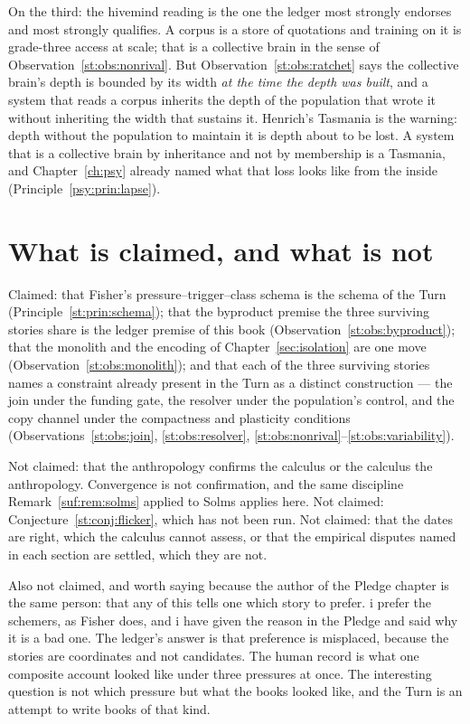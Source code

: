 On the third: the hivemind reading is the one the ledger most strongly endorses and most strongly qualifies. A corpus is a store of quotations and training on it is grade-three access at scale; that is a collective brain in the sense of Observation~\ref{st:obs:nonrival}. But Observation~\ref{st:obs:ratchet} says the collective brain's depth is bounded by its width \emph{at the time the depth was built}, and a system that reads a corpus inherits the depth of the population that wrote it without inheriting the width that sustains it. Henrich's Tasmania is the warning: depth without the population to maintain it is depth about to be lost. A system that is a collective brain by inheritance and not by membership is a Tasmania, and Chapter~\ref{ch:psy} already named what that loss looks like from the inside (Principle~\ref{psy:prin:lapse}).

\section{What is claimed, and what is not}
\label{st:sec:claims}

Claimed: that Fisher's pressure--trigger--class schema is the schema of the Turn (Principle~\ref{st:prin:schema}); that the byproduct premise the three surviving stories share is the ledger premise of this book (Observation~\ref{st:obs:byproduct}); that the monolith and the encoding of Chapter~\ref{sec:isolation} are one move (Observation~\ref{st:obs:monolith}); and that each of the three surviving stories names a constraint already present in the Turn as a distinct construction --- the join under the funding gate, the resolver under the population's control, and the copy channel under the compactness and plasticity conditions (Observations~\ref{st:obs:join}, \ref{st:obs:resolver}, \ref{st:obs:nonrival}--\ref{st:obs:variability}).

Not claimed: that the anthropology confirms the calculus or the calculus the anthropology. Convergence is not confirmation, and the same discipline Remark~\ref{suf:rem:solms} applied to Solms applies here. Not claimed: Conjecture~\ref{st:conj:flicker}, which has not been run. Not claimed: that the dates are right, which the calculus cannot assess, or that the empirical disputes named in each section are settled, which they are not.

Also not claimed, and worth saying because the author of the Pledge chapter is the same person: that any of this tells one which story to prefer. i prefer the schemers, as Fisher does, and i have given the reason in the Pledge and said why it is a bad one. The ledger's answer is that preference is misplaced, because the stories are coordinates and not candidates. The human record is what one composite account looked like under three pressures at once. The interesting question is not which pressure but what the books looked like, and the Turn is an attempt to write books of that kind.
